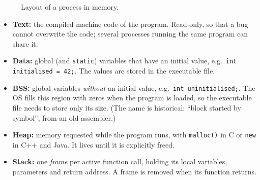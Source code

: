 \documentclass[11pt,a4paper]{article}
\newcommand{\cmd}[1]{\texttt{#1}}
\begin{document}
\begin{figure}[H]
\centering
{}
\caption{Layout of a process in memory.}
\end{figure}

\begin{itemize}
  \item \textbf{Text:} the compiled machine code of the program. Read-only, so that a bug cannot overwrite the code; several processes running the same program can share it.
  \item \textbf{Data:} global (and \texttt{static}) variables that have an initial value, e.g.\ \texttt{int initialised = 42;}. The values are stored in the executable file.
  \item \textbf{BSS:} global variables \emph{without} an initial value, e.g.\ \texttt{int uninitialised;}. The OS fills this region with zeros when the program is loaded, so the executable file needs to store only its size. (The name is historical: ``block started by symbol'', from an old assembler.)
  \item \textbf{Heap:} memory requested while the program runs, with \cmd{malloc()} in C or \texttt{new} in C++ and Java. It lives until it is explicitly freed.
  \item \textbf{Stack:} one \emph{frame} per active function call, holding its local variables, parameters and return address. A frame is removed when its function returns.
\end{itemize}
\end{document}
